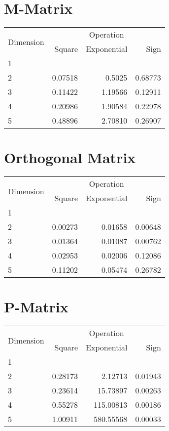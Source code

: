 \documentclass{article}
\begin{document}
\section{M-Matrix}
\begin{tabular}{@{}lrrr@{}}
\toprule
\multirow{2}{*}{Dimension} & \multicolumn{3}{c}{Operation} \\
\cmidrule(l){2-4}
& Square & Exponential & Sign \\
\midrule
1 & & & \\
2 & 0.07518 & 0.5025 & 0.68773 \\
3 & 0.11422 & 1.19566 & 0.12911 \\
4 & 0.20986 & 1.90584 & 0.22978 \\
5 & 0.48896 & 2.70810 & 0.26907 \\
\bottomrule
\end{tabular}

\section{Orthogonal Matrix}
\begin{tabular}{@{}lrrr@{}}
\toprule
\multirow{2}{*}{Dimension} & \multicolumn{3}{c}{Operation} \\
\cmidrule(l){2-4}
& Square & Exponential & Sign \\
\midrule
1 & & & \\
2 & 0.00273 & 0.01658 & 0.00648 \\
3 & 0.01364 & 0.01087 & 0.00762 \\
4 & 0.02953 & 0.02006 & 0.12086 \\
5 & 0.11202 & 0.05474 & 0.26782 \\
\bottomrule
\end{tabular}

\section{P-Matrix}
\begin{tabular}{@{}lrrr@{}}
\toprule
\multirow{2}{*}{Dimension} & \multicolumn{3}{c}{Operation} \\
\cmidrule(l){2-4}
& Square & Exponential & Sign \\
\midrule
1 & & & \\
2 & 0.28173 & 2.12713 & 0.01943 \\
3 & 0.23614 & 15.73897 & 0.00263 \\
4 & 0.55278 & 115.00813 & 0.00186 \\
5 & 1.00911 & 580.55568 & 0.00033 \\
\bottomrule
\end{tabular}
\end{document}
